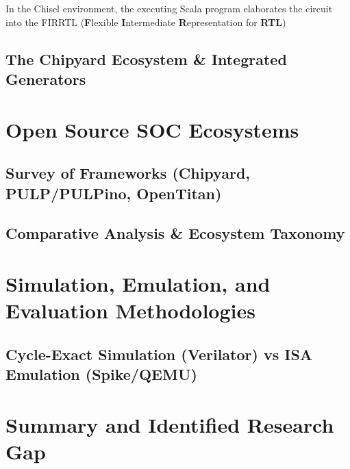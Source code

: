 In the Chisel environment, the executing Scala program elaborates the circuit into the \gls{FIRRTL} (\textbf{F}lexible \textbf{I}ntermediate \textbf{R}epresentation for \textbf{RTL}) \cite{amid2020chipyard}



\subsection{The Chipyard Ecosystem \& Integrated Generators}

\section{Open Source SOC Ecosystems}

\subsection{Survey of Frameworks (Chipyard, PULP/PULPino, OpenTitan)}

\subsection{Comparative Analysis \& Ecosystem Taxonomy}

\section{Simulation, Emulation, and Evaluation Methodologies}

\subsection{Cycle-Exact Simulation (Verilator) vs ISA Emulation (Spike/QEMU)}


\section{Summary and Identified Research Gap}






